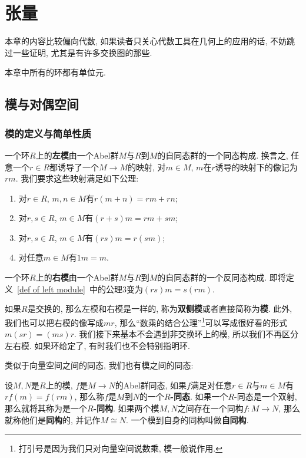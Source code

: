 \chapter{张量}
本章的内容比较偏向代数, 如果读者只关心代数工具在几何上的应用的话, 不妨跳过一些证明, 尤其是有许多交换图的那些.

本章中所有的环都有单位元.

\section{模与对偶空间}

\subsection*{模的定义与简单性质}

\begin{defn}\label{def of left module}
    一个环$R$上的\textbf{左模}由一个Abel群$M$与$R$到$M$的自同态群的一个同态构成.
    换言之, 任意一个$r\in R$都诱导了一个$M\to M$的映射, 对$m\in M$, $m$在$r$诱导的映射下的像记为$rm$.
    我们要求这些映射满足如下公理:
    \begin{enumerate}
        \item 对$r\in R$, $m,n\in M$有$r(m+n)=rm+rn$;
        \item 对$r,s\in R$, $m\in M$有$(r+s)m=rm+sm$;
        \item 对$r,s\in R$, $m\in M$有$(rs)m=r(sm)$;
        \item 对任意$m\in M$有$1m=m$.
    \end{enumerate}
\end{defn}

\begin{defn}
    一个环$R$上的\textbf{右模}由一个Abel群$M$与$R$到$M$的自同态群的一个反同态构成.
    即将定义~\ref{def of left module}~中的公理3变为$(rs)m=s(rm)$.
\end{defn}

\begin{rem}
    如果$R$是交换的, 那么左模和右模是一样的, 称为\textbf{双侧模}或者直接简称为\textbf{模}.
    此外, 我们也可以把右模的像写成$mr$, 那么``数乘的结合公理''\footnote{打引号是因为我们只对向量空间说数乘, 模一般说作用.}可以写成很好看的形式$m(sr)=(ms)r$.
    我们接下来基本不会遇到非交换环上的模, 所以我们不再区分左右模.
    如果环给定了, 有时我们也不会特别指明环.
\end{rem}

类似于向量空间之间的同态, 我们也有模之间的同态:
\begin{defn}
    设$M,N$是$R$上的模, $f$是$M\to N$的Abel群同态, 如果$f$满足对任意$r\in R$与$m\in M$有$rf(m)=f(rm)$, 那么称$f$是$M$到$N$的一个\textbf{$R$-同态}.
    如果一个$R$-同态是一个双射, 那么就将其称为是一个\textbf{$R$-同构}.
    如果两个模$M,N$之间存在一个同构$f:M\to N$, 那么就称他们是\textbf{同构}的, 并记作$M\cong N$.
    一个模到自身的同构叫做\textbf{自同构}.
\end{defn}

